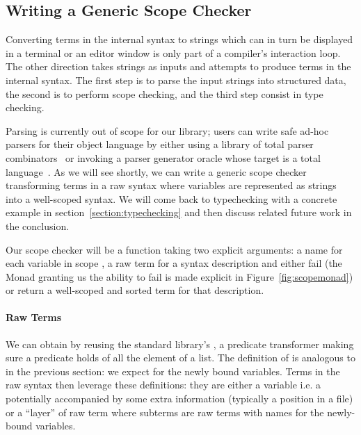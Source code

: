 \subsection{Writing a Generic Scope Checker}\label{section:genericscoping}

Converting terms in the internal syntax to strings which can in turn be
displayed in a terminal or an editor window is only part of a compiler's
interaction loop. The other direction takes strings as inputs and attempts to
produce terms in the internal syntax. The first step is to parse the input
strings into structured data, the second is to perform scope checking,
and the third step consist in type checking.

Parsing is currently out of scope for our library; users can write safe
ad-hoc parsers for their object language by either using a library of total
parser combinators~\cite{DBLP:conf/icfp/Danielsson10,allais2018agdarsec}
or invoking a parser generator oracle whose target is a total
language~\cite{Stump:2016:VFP:2841316}. As we will see shortly, we can
write a generic scope checker transforming terms in a raw syntax where
variables are represented as strings into a well-scoped syntax. We will
come back to typechecking with a concrete example in section~\ref{section:typechecking}
and then discuss related future work in the conclusion.

Our scope checker will be a function taking two explicit arguments: a name for
each variable in scope , a raw term for a syntax description  and
either fail (the Monad  granting us the ability to fail is made explicit
in Figure~\ref{fig:scopemonad}) or return a well-scoped and sorted term for
that description.


\paragraph{Raw Terms} We can obtain  by reusing the standard library's
, a predicate transformer making sure a predicate holds of all the element
of a list. The definition of  is analogous to  in the
previous section: we expect  for the newly bound variables.
Terms in the raw syntax then leverage these definitions: they are either a variable
i.e. a  potentially accompanied by some extra information  (typically
a position in a file) or a ``layer'' of raw term where subterms are raw terms with
names for the newly-bound variables.

